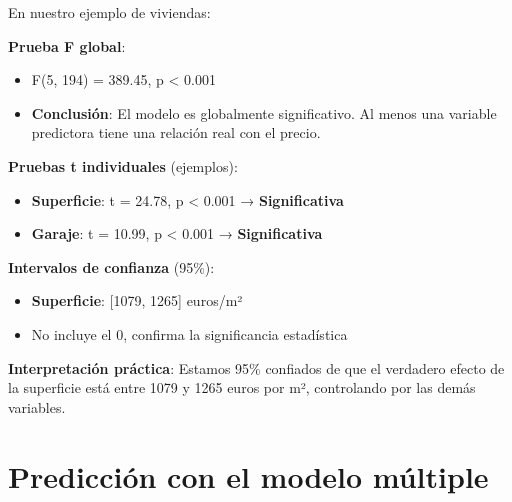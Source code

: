 \documentclass[
  letterpaper,
  DIV=11,
  numbers=noendperiod]{scrreprt}
\providecommand{\tightlist}{%
  \setlength{\itemsep}{0pt}\setlength{\parskip}{0pt}}
\begin{document}
\begin{tcolorbox}[enhanced jigsaw, leftrule=.75mm, breakable, colbacktitle=quarto-callout-tip-color!10!white, bottomrule=.15mm, colframe=quarto-callout-tip-color-frame, toprule=.15mm, colback=white, coltitle=black, bottomtitle=1mm, left=2mm, title=\textcolor{quarto-callout-tip-color}{\faLightbulb}\hspace{0.5em}{Interpretación de las pruebas estadísticas}, opacityback=0, arc=.35mm, opacitybacktitle=0.6, toptitle=1mm, titlerule=0mm, rightrule=.15mm]

En nuestro ejemplo de viviendas:

\textbf{Prueba F global}:

\begin{itemize}
\tightlist
\item
  F(5, 194) = 389.45, p \textless{} 0.001
\item
  \textbf{Conclusión}: El modelo es globalmente significativo. Al menos
  una variable predictora tiene una relación real con el precio.
\end{itemize}

\textbf{Pruebas t individuales} (ejemplos):

\begin{itemize}
\tightlist
\item
  \textbf{Superficie}: t = 24.78, p \textless{} 0.001 →
  \textbf{Significativa}
\item
  \textbf{Garaje}: t = 10.99, p \textless{} 0.001 →
  \textbf{Significativa}
\end{itemize}

\textbf{Intervalos de confianza} (95\%):

\begin{itemize}
\tightlist
\item
  \textbf{Superficie}: {[}1079, 1265{]} euros/m²
\item
  No incluye el 0, confirma la significancia estadística
\end{itemize}

\textbf{Interpretación práctica}: Estamos 95\% confiados de que el
verdadero efecto de la superficie está entre 1079 y 1265 euros por m²,
controlando por las demás variables.

\end{tcolorbox}

\section{Predicción con el modelo
múltiple}\label{predicciuxf3n-con-el-modelo-muxfaltiple}
\end{document}
